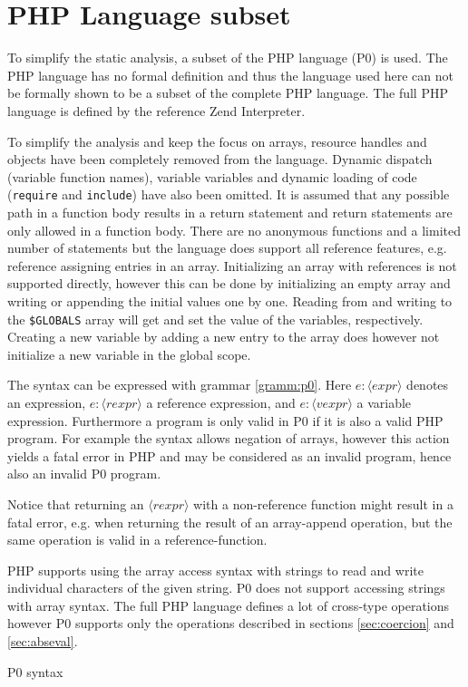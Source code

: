 \section{PHP Language subset}
\newcommand{\syn}[1]{\langle\mathit{#1}\rangle}
\label{sec:langsubset}
To simplify the static analysis, a subset of the PHP language (P0) is used. The PHP language has no formal definition and thus the language used here can not be formally shown to be a subset of the complete PHP language. The full PHP language is defined by the reference Zend Interpreter.

To simplify the analysis and keep the focus on arrays, resource handles and objects have been completely removed from the language. Dynamic dispatch (variable function names), variable variables and dynamic loading of code (\texttt{require} and \texttt{include}) have also been omitted. It is assumed that any possible path in a function body results in a return statement and return statements are only allowed in a function body. There are no anonymous functions and a limited number of statements but the language does support all reference features, e.g. reference assigning entries in an array. Initializing an array with references is not supported directly, however this can be done by initializing an empty array and writing or appending the initial values one by one. Reading from and writing to the \texttt{\$GLOBALS} array will get and set the value of the variables, respectively. Creating a new variable by adding a new entry to the array does however not initialize a new variable in the global scope.

The syntax can be expressed with grammar \ref{gramm:p0}. Here $e : \syn{expr}$ denotes an expression, $e : \syn{rexpr}$ a reference expression, and $e : \syn{vexpr}$ a variable expression.   Furthermore a program is only valid in P0 if it is also a valid PHP program. For example the syntax allows negation of arrays, however this action yields a fatal error in PHP and may be considered as an invalid program, hence also an invalid P0 program. 

Notice that returning an $\syn{rexpr}$ with a non-reference function might result in a fatal error, e.g. when returning the result of an array-append operation, but the same operation is valid in a reference-function.

PHP supports using the array access syntax with strings to read and write individual characters of the given string. P0 does not support accessing strings with array syntax. The full PHP language defines a lot of cross-type operations however P0 supports only the operations described in sections \ref{sec:coercion} and \ref{sec:abseval}.





\begin{grammarf}
\centering

\caption{P0 syntax }
\label{gramm:p0}
\end{grammarf}